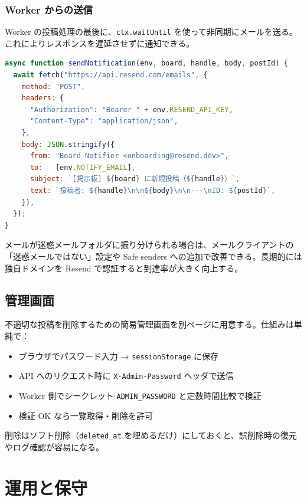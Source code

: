 \documentclass[11pt,a4paper,uplatex,dvipdfmx]{jsarticle}
\begin{document}
\subsubsection{Worker からの送信}

Worker の投稿処理の最後に、\texttt{ctx.waitUntil} を使って非同期にメールを送る。これによりレスポンスを遅延させずに通知できる。

\begin{lstlisting}[language=JavaScript]
async function sendNotification(env, board, handle, body, postId) {
  await fetch("https://api.resend.com/emails", {
    method: "POST",
    headers: {
      "Authorization": "Bearer " + env.RESEND_API_KEY,
      "Content-Type": "application/json",
    },
    body: JSON.stringify({
      from: "Board Notifier <onboarding@resend.dev>",
      to:   [env.NOTIFY_EMAIL],
      subject: `[掲示板] ${board} に新規投稿（${handle}）`,
      text: `投稿者: ${handle}\n\n${body}\n\n---\nID: ${postId}`,
    }),
  });
}
\end{lstlisting}

メールが迷惑メールフォルダに振り分けられる場合は、メールクライアントの「迷惑メールではない」設定や Safe senders への追加で改善できる。長期的には独自ドメインを Resend で認証すると到達率が大きく向上する。

\subsection{管理画面}

不適切な投稿を削除するための簡易管理画面を別ページに用意する。仕組みは単純で：

\begin{itemize}
\item ブラウザでパスワード入力 → \texttt{sessionStorage} に保存
\item API へのリクエスト時に \texttt{X-Admin-Password} ヘッダで送信
\item Worker 側でシークレット \texttt{ADMIN\_PASSWORD} と定数時間比較で検証
\item 検証 OK なら一覧取得・削除を許可
\end{itemize}

削除はソフト削除（\texttt{deleted\_at} を埋めるだけ）にしておくと、誤削除時の復元やログ確認が容易になる。

\section{運用と保守}
\end{document}

